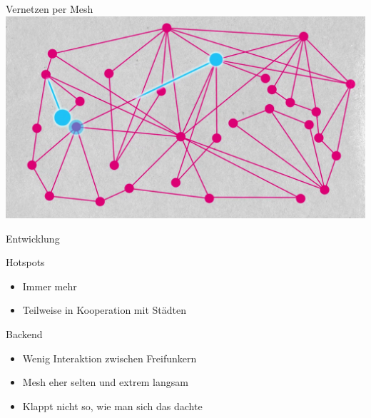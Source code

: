 \documentclass{beamer}
\begin{document}
	\begin{frame}{Vernetzen per Mesh}
		\includegraphics[width=\textwidth]{media/mesh2.png}
	\end{frame}

	\begin{frame}{Entwicklung}
		\begin{block}{Hotspots}
			\begin{itemize}
				\item Immer mehr
				\item Teilweise in Kooperation mit Städten
			\end{itemize}
		\end{block}
		\vspace{1em}
		\pause
		\begin{block}{Backend}
			\begin{itemize}
				\item Wenig Interaktion zwischen Freifunkern
				\item Mesh eher selten und extrem langsam
				\item Klappt nicht so, wie man sich das dachte
			\end{itemize}
		\end{block}
	\end{frame}
\end{document}
